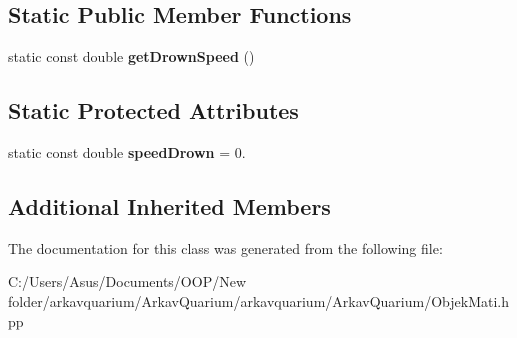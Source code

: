 \subsection*{Static Public Member Functions}
\begin{DoxyCompactItemize}
\item 
\mbox{\label{class_objek_mati_aab2918cafc29ccf19de4d40d62002ef4}} 
static const double {\bfseries get\+Drown\+Speed} ()
\end{DoxyCompactItemize}
\subsection*{Static Protected Attributes}
\begin{DoxyCompactItemize}
\item 
\mbox{\label{class_objek_mati_a333ce61c14105232d5ae8d6bc4549f5e}} 
static const double {\bfseries speed\+Drown} = 0.
\end{DoxyCompactItemize}
\subsection*{Additional Inherited Members}


The documentation for this class was generated from the following file\+:\begin{DoxyCompactItemize}
\item 
C\+:/\+Users/\+Asus/\+Documents/\+O\+O\+P/\+New folder/arkavquarium/\+Arkav\+Quarium/arkavquarium/\+Arkav\+Quarium/Objek\+Mati.\+hpp\end{DoxyCompactItemize}
